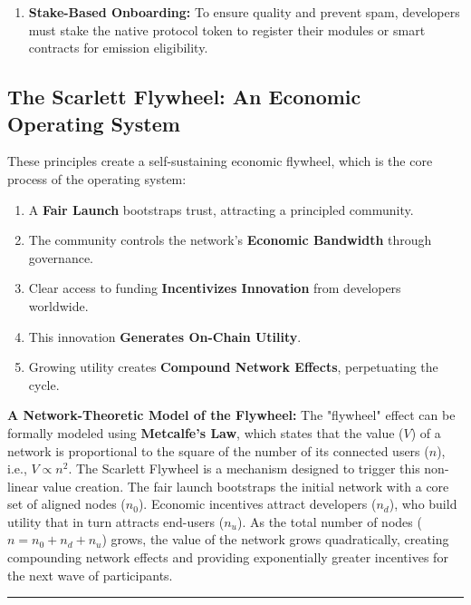 \documentclass[10pt]{article}
\begin{document}
\begin{enumerate}[leftmargin=*, itemsep=2pt]
\begin{itemize}[leftmargin=*, itemsep=2pt]
\begin{itemize}[leftmargin=*, itemsep=2pt]
            \item \textbf{Specialized Scientific \& Financial Modeling:} For applications like drug discovery and market forecasting.
            \item \textbf{AI-Driven Prediction Markets:} Establishing decentralized exchanges for forecasting.
            \item \textbf{Autonomous Agent Economies:} Facilitating on-chain AI agents that can own assets and offer services.
        \end{itemize}
      This open application space allows for composable innovation atop Scarlett’s core infrastructure.
    \end{itemize}
    This dual environment provides flexibility for all types of developers.
    \item \textbf{Stake-Based Onboarding:} To ensure quality and prevent spam, developers must stake the native protocol token to register their modules or smart contracts for emission eligibility.
\end{enumerate}

\subsection{The Scarlett Flywheel: An Economic Operating System}
These principles create a self-sustaining economic flywheel, which is the core process of the operating system:
\begin{enumerate}[leftmargin=*, itemsep=2pt]
    \item A \textbf{Fair Launch} bootstraps trust, attracting a principled community.
    \item The community controls the network's \textbf{Economic Bandwidth} through governance.
    \item Clear access to funding \textbf{Incentivizes Innovation} from developers worldwide.
    \item This innovation \textbf{Generates On-Chain Utility}.
    \item Growing utility creates \textbf{Compound Network Effects}, perpetuating the cycle.
\end{enumerate}

\textbf{A Network-Theoretic Model of the Flywheel:} The "flywheel" effect can be formally modeled using \textbf{Metcalfe's Law}, which states that the value (\(V\)) of a network is proportional to the square of the number of its connected users (\(n\)), i.e., \(V \propto n^2\). The Scarlett Flywheel is a mechanism designed to trigger this non-linear value creation. The fair launch bootstraps the initial network with a core set of aligned nodes (\(n_0\)). Economic incentives attract developers (\(n_d\)), who build utility that in turn attracts end-users (\(n_u\)). As the total number of nodes (\(n = n_0 + n_d + n_u\)) grows, the value of the network grows quadratically, creating compounding network effects and providing exponentially greater incentives for the next wave of participants.
\vspace{1em}
\hrule
\newpage
\end{document}
